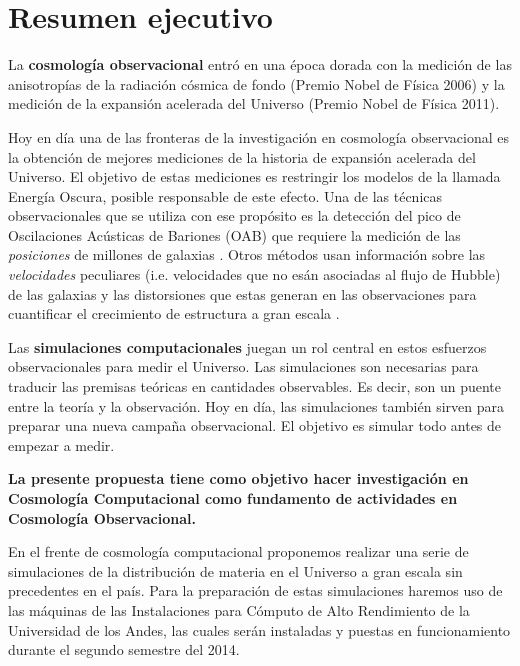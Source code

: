 
\section{Resumen ejecutivo}

La {\bf cosmología observacional} entró en una época dorada con la medición
de las anisotropías de la radiación cósmica de fondo (Premio Nobel de
Física 2006) y la medición de la expansión acelerada del Universo
(Premio Nobel de Física 2011). 

Hoy en d\'ia una de las fronteras de la investigación en cosmología
observacional es la obtenci\'on de mejores mediciones de la historia de
expansión acelerada del Universo.
El objetivo de estas mediciones es restringir los  modelos de la
llamada Energ\'ia Oscura, posible responsable de este efecto. 
Una de las t\'ecnicas observacionales que se utiliza con ese
prop\'osito es la detecci\'on del pico de Oscilaciones Ac\'usticas de
Bariones (OAB) que requiere la medici\'on de las \emph{posiciones} de
millones de galaxias \cite{Eisenstein2005}. 
Otros m\'etodos usan informaci\'on sobre las \emph{velocidades}
peculiares (i.e. velocidades que no es\'an asociadas al flujo de
Hubble) de las galaxias y las distorsiones que estas generan en las
observaciones para cuantificar el crecimiento de estructura a gran
escala \cite{Scoccimarro2004}. 

Las {\bf simulaciones computacionales} juegan un rol central en estos
esfuerzos observacionales para medir el Universo.
Las simulaciones son necesarias para traducir las premisas te\'oricas
en cantidades observables. 
Es decir, son un puente entre la teor\'ia y
la  observaci\'on. 
Hoy en d\'ia,  las simulaciones tambi\'en sirven para preparar una
nueva campa\~na observacional.  
El objetivo es simular todo antes de empezar a medir. 


{\bf La presente propuesta tiene como objetivo hacer investigaci\'on en
Cosmolog\'ia Computacional como fundamento de actividades en
Cosmolog\'ia Observacional.}

En el frente de cosmolog\'ia computacional proponemos realizar una serie de
simulaciones de la distribuci\'on de materia en el Universo a gran
escala sin precedentes en el pa\'is. 
Para la preparaci\'on de estas simulaciones haremos uso de las
m\'aquinas de las Instalaciones para C\'omputo de Alto Rendimiento de
la Universidad de los Andes, las cuales ser\'an instaladas y puestas
en funcionamiento durante el segundo semestre del 2014.

